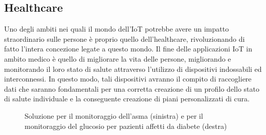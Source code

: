 \subsection{Healthcare}
Uno degli ambiti nei quali il mondo dell'IoT potrebbe avere un impatto straordinario sulle persone è proprio quello dell'healthcare, rivoluzionando di fatto l'intera concezione legate a questo mondo.
Il fine delle applicazioni IoT in ambito medico è quello di migliorare la vita delle persone, migliorando e monitorando il loro stato di salute attraverso l'utilizzo di dispositivi indossabili ed interconnessi.
In questo modo, tali dispositivi avranno il compito di raccogliere dati che saranno fondamentali per una corretta creazione di un profilo dello stato di salute individuale e la conseguente creazione di piani personalizzati di cura.
\begin{figure}%
	\centering
	\qquad
	\caption{Soluzione per il monitoraggio dell'asma (sinistra) e per il monitoraggio del glucosio per pazienti affetti da diabete (destra)}%
	\label{fig:application_healthcare}%
\end{figure}


